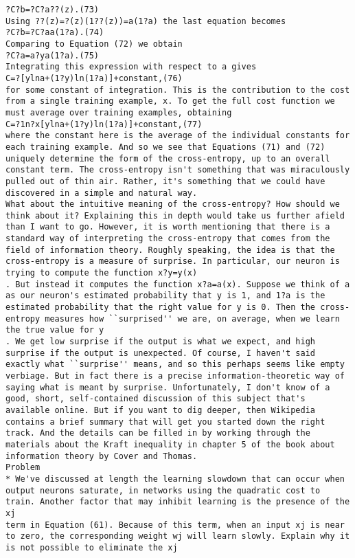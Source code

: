 \begin{lstlisting}
?C?b=?C?a??(z).(73)
Using ??(z)=?(z)(1??(z))=a(1?a) the last equation becomes 
?C?b=?C?aa(1?a).(74)
Comparing to Equation (72) we obtain 
?C?a=a?ya(1?a).(75)
Integrating this expression with respect to a gives 
C=?[ylna+(1?y)ln(1?a)]+constant,(76)
for some constant of integration. This is the contribution to the cost from a single training example, x. To get the full cost function we must average over training examples, obtaining 
C=?1n?x[ylna+(1?y)ln(1?a)]+constant,(77)
where the constant here is the average of the individual constants for each training example. And so we see that Equations (71) and (72) uniquely determine the form of the cross-entropy, up to an overall constant term. The cross-entropy isn't something that was miraculously pulled out of thin air. Rather, it's something that we could have discovered in a simple and natural way.
What about the intuitive meaning of the cross-entropy? How should we think about it? Explaining this in depth would take us further afield than I want to go. However, it is worth mentioning that there is a standard way of interpreting the cross-entropy that comes from the field of information theory. Roughly speaking, the idea is that the cross-entropy is a measure of surprise. In particular, our neuron is trying to compute the function x?y=y(x)
. But instead it computes the function x?a=a(x). Suppose we think of a as our neuron's estimated probability that y is 1, and 1?a is the estimated probability that the right value for y is 0. Then the cross-entropy measures how ``surprised'' we are, on average, when we learn the true value for y
. We get low surprise if the output is what we expect, and high surprise if the output is unexpected. Of course, I haven't said exactly what ``surprise'' means, and so this perhaps seems like empty verbiage. But in fact there is a precise information-theoretic way of saying what is meant by surprise. Unfortunately, I don't know of a good, short, self-contained discussion of this subject that's available online. But if you want to dig deeper, then Wikipedia contains a brief summary that will get you started down the right track. And the details can be filled in by working through the materials about the Kraft inequality in chapter 5 of the book about information theory by Cover and Thomas.
Problem
* We've discussed at length the learning slowdown that can occur when output neurons saturate, in networks using the quadratic cost to train. Another factor that may inhibit learning is the presence of the xj
term in Equation (61). Because of this term, when an input xj is near to zero, the corresponding weight wj will learn slowly. Explain why it is not possible to eliminate the xj

\end{lstlisting}
